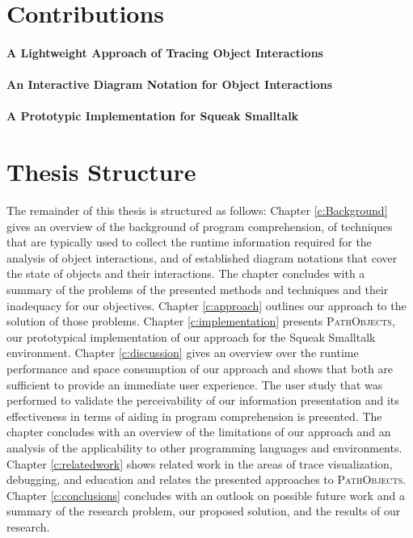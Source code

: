 \section{Contributions}
\label{s:contributions}

\paragraph{A Lightweight Approach of Tracing Object Interactions}
\paragraph{An Interactive Diagram Notation for Object Interactions}
\paragraph{A Prototypic Implementation for Squeak Smalltalk}

\section{Thesis Structure}
The remainder of this thesis is structured as follows:
Chapter \ref{c:Background} gives an overview of the background of program comprehension, of techniques that are typically used to collect the runtime information required for the analysis of object interactions, and of established diagram notations that cover the state of objects and their interactions.
The chapter concludes with a summary of the problems of the presented methods and techniques and their inadequacy for our objectives.
Chapter \ref{c:approach} outlines our approach to the solution of those problems.
Chapter \ref{c:implementation} presents \textsc{PathObjects}, our prototypical implementation of our approach for the Squeak Smalltalk environment.
Chapter \ref{c:discussion} gives an overview over the runtime performance and space consumption of our approach and shows that both are sufficient to provide an immediate user experience.
The user study that was performed to validate the perceivability of our information presentation and its effectiveness in terms of aiding in program comprehension is presented.
The chapter concludes with an overview of the limitations of our approach and an analysis of the applicability to other programming languages and environments.
Chapter \ref{c:relatedwork} shows related work in the areas of trace visualization, debugging, and education and relates the presented approaches to \textsc{PathObjects}.
Chapter \ref{c:conclusions} concludes with an outlook on possible future work and a summary of the research problem, our proposed solution, and the results of our research.
